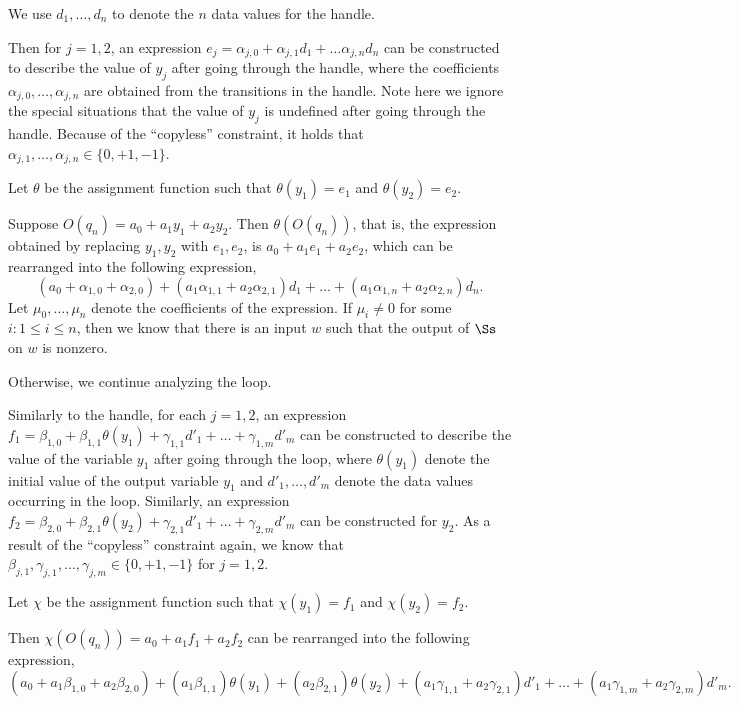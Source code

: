We use $d_1,\dots,d_n$ to denote the $n$ data values for the handle.

Then for $j=1,2$, an expression $e_{j}=\alpha_{j,0}+ \alpha_{j,1}d_1 + \dots \alpha_{j,n}d_n$ can be constructed to describe the value of $y_{j}$ after going through the handle, where the coefficients $\alpha_{j,0},\dots, \alpha_{j,n}$ are obtained from the transitions in the handle. Note here we ignore the special situations that the value of $y_{j}$ is undefined after going through the handle. Because of the ``copyless'' constraint, it holds that $\alpha_{j,1},\dots,\alpha_{j,n} \in \{0,+1,-1\}$.

Let $\theta$ be the assignment function such that $\theta(y_1)=e_1$ and $\theta(y_2)=e_2$.

Suppose $O(q_n)=a_0+a_1 y_{1} + a_2 y_2$. Then $\theta(O(q_n))$, that is, the expression obtained by replacing $y_1,y_2$ with $e_1,e_2$, is $a_0+a_1 e_{1} + a_2 e_2$, which can be rearranged into the following expression,
\[
(a_0 + \alpha_{1,0}+\alpha_{2,0}) + (a_1 \alpha_{1,1}+a_2 \alpha_{2,1}) d_1 + \dots + (a_1 \alpha_{1,n}+a_2 \alpha_{2,n}) d_n.
\]
Let $\mu_0,\dots,\mu_n$ denote the coefficients of the expression. 
If $\mu_i \neq 0$ for some $i: 1 \le i \le n$, then we know that there is an input $w$ such that the output of $\Ss$ on $w$ is nonzero.

Otherwise, we continue analyzing the loop. 

Similarly to the handle, for each $j=1,2$, an expression $f_1 = \beta_{1,0} + \beta_{1,1} \theta(y_1) + \gamma_{1,1} d'_1 + \dots + \gamma_{1,m} d'_m$ can be constructed to describe the value of the variable $y_{1}$ after going through the loop, where $\theta(y_{1})$ denote the initial value of the output variable $y_1$ and $d'_1, \dots, d'_m$ denote the data values occurring in the loop. Similarly, an expression $f_2 = \beta_{2,0} + \beta_{2,1} \theta(y_2) + \gamma_{2,1} d'_1 + \dots + \gamma_{2,m} d'_m$ can be constructed for $y_2$. As a result of the ``copyless'' constraint again, we know that $\beta_{j,1}, \gamma_{j,1},\dots,\gamma_{j,m} \in \{0,+1,-1\}$ for $j=1,2$.

Let $\chi$ be the assignment function such that $\chi(y_1)=f_1$ and $\chi(y_2)=f_2$.

Then $\chi(O(q_n)) = a_0 + a_1 f_1 + a_2 f_2$ can be rearranged into the following expression,
\[
(a_0 + a_1 \beta_{1,0} + a_2 \beta_{2,0} ) + (a_1 \beta_{1,1})\theta(y_1)+(a_2 \beta_{2,1} )\theta(y_2) + 
 (a_1\gamma_{1,1} + a_2 \gamma_{2,1}) d'_1 + \dots + (a_1\gamma_{1,m} + a_2 \gamma_{2,m}) d'_m.
\]


